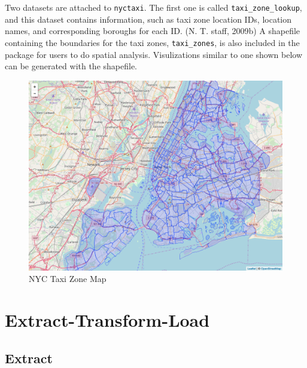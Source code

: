\documentclass[12pt,twoside]{reedthesis}
\theoremstyle{definition}
\theoremstyle{definition}
\theoremstyle{definition}
\theoremstyle{remark}
\begin{document}
Two datasets are attached to \texttt{nyctaxi}. The first one is called
\texttt{taxi\_zone\_lookup}, and this dataset contains information, such
as taxi zone location IDs, location names, and corresponding boroughs
for each ID. (N. T. staff, 2009b) A shapefile containing the boundaries
for the taxi zones, \texttt{taxi\_zones}, is also included in the
package for users to do spatial analysis. Visulizations similar to one
shown below can be generated with the shapefile.
\begin{figure}

{\centering \includegraphics[width=5.84in]{figure/zonemap} 

}

\caption{NYC Taxi Zone Map}\label{fig:zonemap}
\end{figure}
\section{Extract-Transform-Load}\label{extract-transform-load}

\subsection{Extract}\label{extract}
\end{document}
